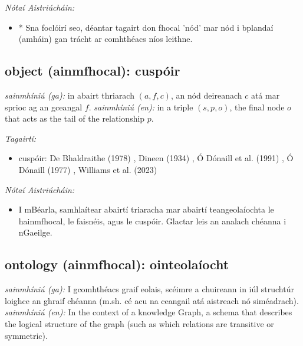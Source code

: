 \documentclass{article}
\begin{document}
 \noindent \textit{Nótaí Aistriúcháin:}
\begin{itemize}
	\item * Sna foclóirí seo, déantar tagairt don fhocal 'nód' mar nód i bplandaí (amháin) gan trácht ar comhthéacs níos leithne.
\end{itemize}


\subsection*{object (ainmfhocal): cuspóir} 
 \noindent \textit{sainmhíniú (ga):} in abairt thriarach $(a,f,c)$, an nód deireanach $c$ atá mar sprioc ag an gceangal $f$.
\newline\newline
 \noindent \textit{sainmhíniú (en):} in a triple $(s,p,o)$, the final node $o$ that acts as the tail of the relationship $p$.
\newline

 \noindent \textit{Tagairtí:}
\begin{itemize}
	\item cuspóir: De Bhaldraithe (1978) \cite{de-bhaldraithe}, Dineen (1934) \cite{dineen}, Ó Dónaill et al. (1991) \cite{focloir-beag}, Ó Dónaill (1977) \cite{odonaill}, Williams et al. (2023) \cite{storchiste}
\end{itemize}

 \noindent \textit{Nótaí Aistriúcháin:}
\begin{itemize}
	\item I mBéarla, samhlaítear abairtí triaracha mar abairtí teangeolaíochta le hainmfhocal, le faisnéis, agus le cuspóir. Glactar leis an analach chéanna i nGaeilge.
\end{itemize}


\subsection*{ontology (ainmfhocal): ointeolaíocht} 
 \noindent \textit{sainmhíniú (ga):} I gcomhthéacs graif eolais, scéimre a chuireann in iúl struchtúr loighce an ghraif chéanna (m.sh. cé acu na ceangail atá aistreach nó siméadrach).
\newline\newline
 \noindent \textit{sainmhíniú (en):} In the context of a knowledge Graph, a schema that describes the logical structure of the graph (such as which relations are transitive or symmetric).
\newline
\end{document}
